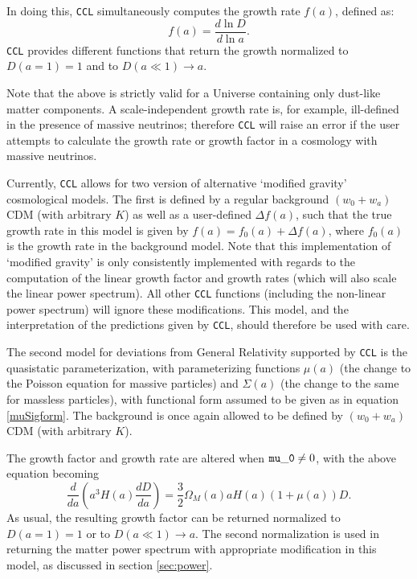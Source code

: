 \documentclass[\docopts]{\docclass}
\newcommand{\ccl}{{\tt CCL}\xspace}
\begin{document}
In doing this, \ccl simultaneously computes the growth rate $f(a)$, defined as:
\begin{equation}
  f(a)=\frac{d\ln D}{d\ln a}.
\end{equation}
\ccl provides different functions that return the growth normalized to $D(a=1)=1$ and to $D(a\ll1)\rightarrow a$.

Note that the above is strictly valid for a Universe containing only dust-like matter components. A scale-independent growth rate is, for example, ill-defined in the presence of massive neutrinos; therefore \ccl will raise an error if the user attempts to calculate the growth rate or growth factor in a cosmology with massive neutrinos.

Currently, \ccl allows for two version of alternative `modified gravity' cosmological models. The first is defined by a regular background $(w_0+w_a)$CDM (with arbitrary $K$) as well as a user-defined $\Delta f(a)$, such that the true growth rate in this model is given by $f(a)=f_0(a)+\Delta f(a)$, where $f_0(a)$ is the growth rate in the background model. Note that this implementation of `modified gravity' is only consistently implemented with regards to the computation of the linear growth factor and growth rates (which will also scale the linear power spectrum). All other \ccl functions (including the non-linear power spectrum) will ignore these modifications. This model, and the interpretation of the predictions given by \ccl, should therefore be used with care.

The second model for deviations from General Relativity supported by \ccl is the quasistatic parameterization, with parameterizing functions $\mu(a)$ (the change to the Poisson equation for massive particles) and $\Sigma(a)$ (the change to the same for massless particles), with functional form assumed to be given as in equation \ref{muSigform}. The background is once again allowed to be defined by $(w_0+w_a)$CDM (with arbitrary $K$). 

The growth factor and growth rate are altered when ${\tt mu\_0} \ne 0$, with the above equation becoming
\begin{equation}
  \frac{d}{da}\left(a^3H(a)\frac{dD}{da}\right)=\frac{3}{2}\Omega_M(a)aH(a)(1 + \mu(a))D.
\end{equation}
As usual, the resulting growth factor can be returned normalized to $D(a=1)=1$ or to $D(a\ll1)\rightarrow a$. The second normalization is used in returning the matter power spectrum with appropriate modification in this model, as discussed in section \ref{sec:power}.
\end{document}
